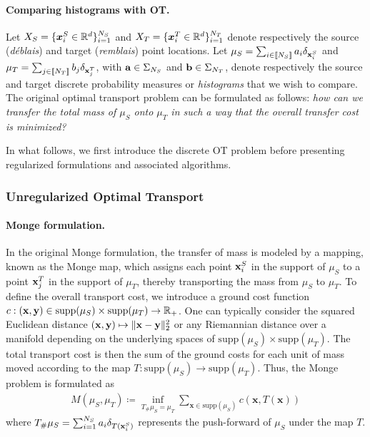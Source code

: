 \paragraph{Comparing histograms with OT.}
Let $X_S = \{ \bm{x}_i^S \in \mathbb{R}^d \}_{i=1}^{N_S}$ and $X_T = \{ \bm{x}_i^T \in \mathbb{R}^d \}_{i=1}^{N_T}$ denote respectively the source (\emph{déblais}) and target (\emph{remblais}) point locations. Let  \(\mu_S = \sum_{i \in {[\![N_S]\!]}} a_i \delta_{{\mathbf{x}}^S_i}\) and \(\mu_T = \sum_{j \in {[\![N_T]\!]}} b_j \delta_{{\mathbf{x}}^T_j}\), with ${\mathbf{a}} \in \Sigma_{N_S}$ and ${\mathbf{b}} \in \Sigma_{N_T}$, denote respectively the source and target discrete probability measures or \emph{histograms} that we wish to compare. The original optimal transport problem can be formulated as follows: \emph{how can we transfer the total mass of \(\mu_S\) onto \(\mu_T\) in such a way that the overall transfer cost is minimized?}

In what follows, we first introduce the discrete OT problem before presenting regularized formulations and associated algorithms.

\subsubsection{Unregularized Optimal Transport}

\paragraph{Monge formulation.}
In the original Monge formulation, the transfer of mass is modeled by a mapping, known as the Monge map, which assigns each point \({\mathbf{x}}^S_i\) in the support of \(\mu_S\) to a point \({\mathbf{x}}^T_j\) in the support of \(\mu_T\), thereby transporting the mass from \(\mu_S\) to \(\mu_T\). To define the overall transport cost, we introduce a ground cost function \(c: ({\mathbf{x}}, {\mathbf{y}}) \in \text{supp}(\mu_S) \times \text{supp}(\mu_T) \to \mathbb{R}_+\). One can typically consider the squared Euclidean distance $({\mathbf{x}}, {\mathbf{y}}) \mapsto \| {\mathbf{x}} - {\mathbf{y}} \|_2^2$ or any Riemannian distance over a manifold \citep{villani2009optimal} depending on the underlying spaces of $\text{supp}(\mu_S) \times \text{supp}(\mu_T)$. The total transport cost is then the sum of the ground costs for each unit of mass moved according to the map $T : \text{supp}(\mu_S) \to \text{supp}(\mu_T)$. Thus, the Monge problem is formulated as
\begin{align}
    \label{eq:monge_pb}
    \tag{Monge}
    M(\mu_S, \mu_T) \coloneqq \inf_{T_{\#}\mu_S = \mu_T} \sum_{\bm{x} \in \text{supp}(\mu_S)} c(\bm{x}, T(\bm{x}))
\end{align}
where \(T_{\#}\mu_S = \sum_{i=1}^{N_S} a_i \delta_{T({\mathbf{x}}_i^S)}\) represents the push-forward of \(\mu_S\) under the map \(T\).


